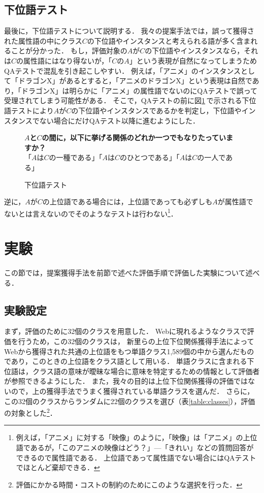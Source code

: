 \subsection{下位語テスト}
\label{sec:hyp-test}
最後に，下位語テストについて説明する．
我々の提案手法では，誤って獲得された属性語の中にクラス$C$の下位語やインスタンスと考えられる語が多く含まれることが分かった．
もし，評価対象の$A$が$C$の下位語やインスタンスなら，それは$C$の属性語にはなり得ないが，「$C$の$A$」という表現が自然になってしまうためQAテストで混乱を引き起こしやすい．
例えば，「アニメ」のインスタンスとして「ドラゴン{\sf X}」があるとすると，「アニメのドラゴン{\sf X}」という表現は自然であり，「ドラゴン{\sf X}」は明らかに「アニメ」の属性語でないのにQAテストで誤って受理されてしまう可能性がある．
そこで，QAテストの前に図\ref{fig:hypo}\,で示される下位語テストにより$A$が$C$の下位語やインスタンスであるかを判定し，下位語やインスタンスでない場合にだけQAテスト以降に進むようにした．

\begin{figure}[t]
\begin{boxedminipage}[h]{\textwidth}
\begin{center}
\begin{flushleft}
{\bf $A$と$C$の間に，以下に挙げる関係のどれか一つでもなりたっていますか？}\\
「$A$は$C$の一種である」「$A$は$C$のひとつである」「$A$は$C$の一人である」
\end{flushleft}
\end{center}
\end{boxedminipage}
\caption{下位語テスト}
\label{fig:hypo}
\end{figure}

逆に，$A$が$C$の上位語である場合には，上位語であっても必ずしも$A$が属性語でないとは言えないのでそのようなテストは行わない\footnote{例えば，「アニメ」に対する「映像」のように，「映像」は「アニメ」の上位語であるが，「このアニメの映像はどう？」—「きれい」などの質問回答ができるので属性語である． 上位語であって属性語でない場合にはQAテストでほとんど棄却できる．}．


\section{実験}
この節では，提案獲得手法を前節で述べた評価手順で評価した実験について述べる．
\label{sec:experiment}

\subsection{実験設定}
まず，評価のために32個のクラスを用意した． 
Webに現れるようなクラスで評価を行うため，この32個のクラスは，
新里らの上位下位関係獲得手法\cite{Shinzato_2004_NAACL04_eng}によってWebから獲得された共通の上位語をもつ単語クラス1,589個の中から選んだものであり，このときの上位語をクラス語として用いる．
単語クラスに含まれる下位語は，クラス語の意味が曖昧な場合に意味を特定するための情報として評価者が参照できるようにした．
また，我々の目的は上位下位関係獲得の評価ではないので，上の獲得手法でうまく獲得されている単語クラスを選んだ．
さらに，この32個のクラスからランダムに22個のクラスを選び（表\ref{table:classes}），評価の対象とした\footnote{評価にかかる時間・コストの制約のためにこのような選択を行った．}．


